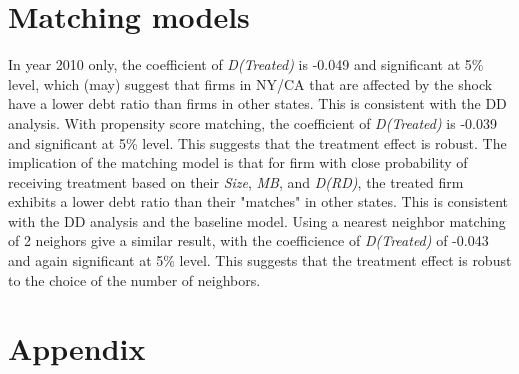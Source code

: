 \documentclass[12pt, times]{article}
\begin{document}
\section*{Matching models}
In year 2010 only, the coefficient of \textit{D(Treated)} is -0.049 and significant at 5\% level, which (may) suggest that
firms in NY/CA that are affected by the shock have a lower debt ratio than firms in other states. This is consistent with the DD analysis.
With propensity score matching, the coefficient of \textit{D(Treated)} is -0.039 and significant at 5\% level.
This suggests that the treatment effect is robust. The implication of the matching model is that for firm with close probability
of receiving treatment based on their \textit{Size}, \textit{MB}, and \textit{D(RD)}, the treated firm exhibits a lower debt ratio
than their "matches" in other states. This is consistent with the DD analysis and the baseline model.
Using a nearest neighbor matching of 2 neighors give a similar result, with the coefficience of \textit{D(Treated)} of -0.043
and again significant at 5\% level. This suggests that the treatment effect is robust to the choice of the number of neighbors.

\section*{Appendix}
\end{document}
